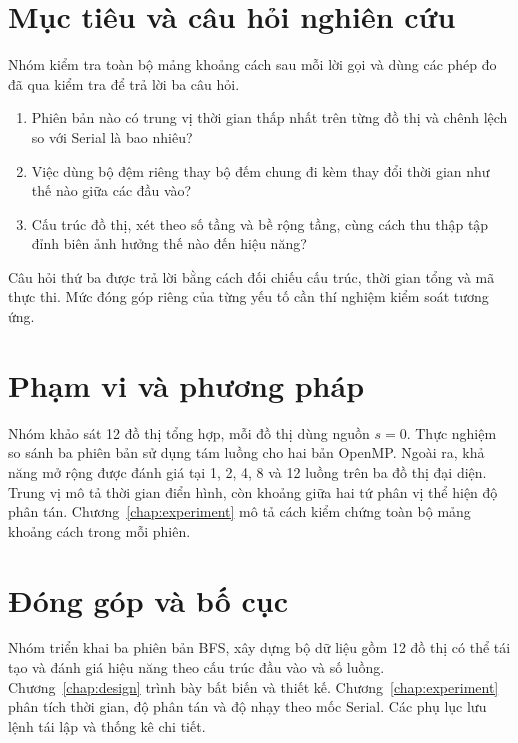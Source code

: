 \section{Mục tiêu và câu hỏi nghiên cứu}
Nhóm kiểm tra toàn bộ mảng khoảng cách sau mỗi lời gọi và dùng các phép đo đã qua kiểm tra để trả lời ba câu hỏi.
\begin{enumerate}
  \item Phiên bản nào có trung vị thời gian thấp nhất trên từng đồ thị và chênh lệch so với Serial là bao nhiêu?
  \item Việc dùng bộ đệm riêng thay bộ đếm chung đi kèm thay đổi thời gian như thế nào giữa các đầu vào?
  \item Cấu trúc đồ thị, xét theo số tầng và bề rộng tầng, cùng cách thu thập tập đỉnh biên ảnh hưởng thế nào đến hiệu năng?
\end{enumerate}
Câu hỏi thứ ba được trả lời bằng cách đối chiếu cấu trúc, thời gian tổng và mã thực thi. Mức đóng góp riêng của từng yếu tố cần thí nghiệm kiểm soát tương ứng.

\section{Phạm vi và phương pháp}
Nhóm khảo sát 12 đồ thị tổng hợp, mỗi đồ thị dùng nguồn $s=0$. Thực nghiệm so sánh ba phiên bản sử dụng tám luồng cho hai bản OpenMP. Ngoài ra, khả năng mở rộng được đánh giá tại 1, 2, 4, 8 và 12 luồng trên ba đồ thị đại diện. Trung vị mô tả thời gian điển hình, còn khoảng giữa hai tứ phân vị thể hiện độ phân tán. Chương~\ref{chap:experiment} mô tả cách kiểm chứng toàn bộ mảng khoảng cách trong mỗi phiên.

\section{Đóng góp và bố cục}
Nhóm triển khai ba phiên bản BFS, xây dựng bộ dữ liệu gồm 12 đồ thị có thể tái tạo và đánh giá hiệu năng theo cấu trúc đầu vào và số luồng. Chương~\ref{chap:design} trình bày bất biến và thiết kế. Chương~\ref{chap:experiment} phân tích thời gian, độ phân tán và độ nhạy theo mốc Serial. Các phụ lục lưu lệnh tái lập và thống kê chi tiết.

